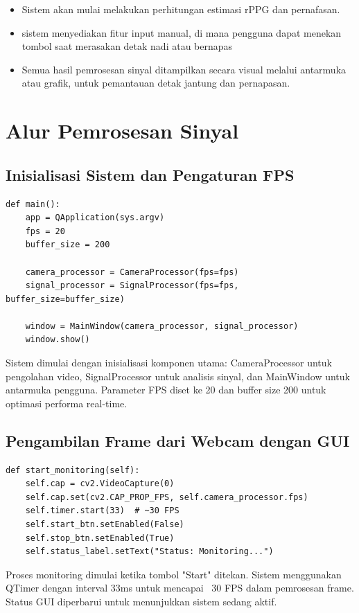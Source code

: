 \documentclass[11pt,a4paper]{article}
\begin{document}
    \begin{itemize}
        \item Sistem akan mulai melakukan perhitungan estimasi rPPG dan pernafasan.
        \item sistem menyediakan fitur input manual, di mana pengguna dapat menekan tombol saat merasakan detak nadi atau bernapas
        \item Semua hasil pemrosesan sinyal ditampilkan secara visual melalui antarmuka atau grafik, untuk pemantauan detak jantung dan pernapasan.
    \end{itemize}


\section{Alur Pemrosesan Sinyal}

\subsection{Inisialisasi Sistem dan Pengaturan FPS}
    \begin{lstlisting}
def main():
    app = QApplication(sys.argv)
    fps = 20
    buffer_size = 200
    
    camera_processor = CameraProcessor(fps=fps)
    signal_processor = SignalProcessor(fps=fps, buffer_size=buffer_size)
    
    window = MainWindow(camera_processor, signal_processor)
    window.show()
    \end{lstlisting}
    Sistem dimulai dengan inisialisasi komponen utama: CameraProcessor untuk pengolahan video, SignalProcessor untuk analisis sinyal, dan MainWindow untuk antarmuka pengguna. Parameter FPS diset ke 20 dan buffer size 200 untuk optimasi performa real-time.

\subsection{Pengambilan Frame dari Webcam dengan GUI}
    \begin{lstlisting}
def start_monitoring(self):
    self.cap = cv2.VideoCapture(0)
    self.cap.set(cv2.CAP_PROP_FPS, self.camera_processor.fps)
    self.timer.start(33)  # ~30 FPS
    self.start_btn.setEnabled(False)
    self.stop_btn.setEnabled(True)
    self.status_label.setText("Status: Monitoring...")
    \end{lstlisting}
    Proses monitoring dimulai ketika tombol "Start" ditekan. Sistem menggunakan QTimer dengan interval 33ms untuk mencapai ~30 FPS dalam pemrosesan frame. Status GUI diperbarui untuk menunjukkan sistem sedang aktif.
\end{document}
